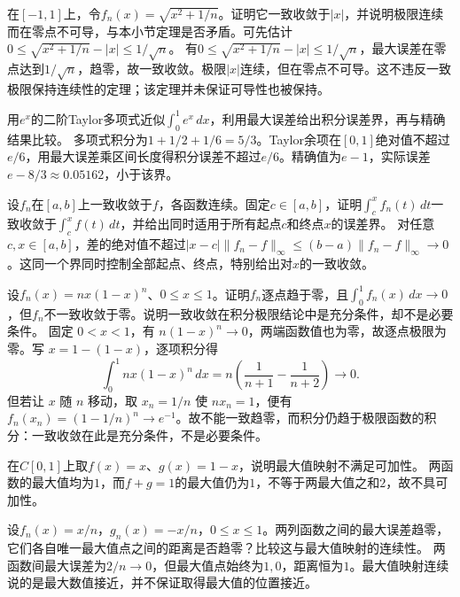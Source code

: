 在\([-1,1]\)上，令\(f_n(x)=\sqrt{x^2+1/n}\)。证明它一致收敛于\(|x|\)，并说明极限连续而在零点不可导，与本小节定理是否矛盾。可先估计\(0\le\sqrt{x^2+1/n}-|x|\le1/\sqrt n\)。
\solutionanswer
有\(0\le\sqrt{x^2+1/n}-|x|\le1/\sqrt n\)，最大误差在零点达到\(1/\sqrt n\)，趋零，故一致收敛。极限\(|x|\)连续，但在零点不可导。这不违反一致极限保持连续性的定理；该定理并未保证可导性也被保持。


用\(e^x\)的二阶Taylor多项式近似\(\int_0^1e^x\,dx\)，利用最大误差给出积分误差界，再与精确结果比较。
\solutionanswer
多项式积分为\(1+1/2+1/6=5/3\)。Taylor余项在\([0,1]\)绝对值不超过\(e/6\)，用最大误差乘区间长度得积分误差不超过\(e/6\)。精确值为\(e-1\)，实际误差\(e-8/3\approx0.05162\)，小于该界。


设\(f_n\)在\([a,b]\)上一致收敛于\(f\)，各函数连续。固定\(c\in[a,b]\)，证明\(\int_c^xf_n(t)\,dt\)一致收敛于\(\int_c^xf(t)\,dt\)，并给出同时适用于所有起点\(c\)和终点\(x\)的误差界。
\solutionanswer
对任意\(c,x\in[a,b]\)，差的绝对值不超过\(|x-c|\|f_n-f\|_\infty\le(b-a)\|f_n-f\|_\infty\to0\)。这同一个界同时控制全部起点、终点，特别给出对\(x\)的一致收敛。


设\(f_n(x)=nx(1-x)^n\)、\(0\le x\le1\)。证明\(f_n\)逐点趋于零，且\(\int_0^1f_n(x)\,dx\to0\)，但\(f_n\)不一致收敛于零。说明一致收敛在积分极限结论中是充分条件，却不是必要条件。
\solutionanswer
固定 \(0<x<1\)，有 \(n(1-x)^n\to0\)，两端函数值也为零，故逐点极限为零。写 \(x=1-(1-x)\)，逐项积分得
\[
 \int_0^1 nx(1-x)^n\,dx
 =n\left(\frac1{n+1}-\frac1{n+2}\right)\longrightarrow0 .
\]
但若让 \(x\) 随 \(n\) 移动，取 \(x_n=1/n\) 使 \(nx_n=1\)，便有 \(f_n(x_n)=(1-1/n)^n\to e^{-1}\)。故不能一致趋零，而积分仍趋于极限函数的积分：一致收敛在此是充分条件，不是必要条件。


在\(C[0,1]\)上取\(f(x)=x\)、\(g(x)=1-x\)，说明最大值映射不满足可加性。
\solutionanswer
两函数的最大值均为\(1\)，而\(f+g=1\)的最大值仍为\(1\)，不等于两最大值之和\(2\)，故不具可加性。


设\(f_n(x)=x/n\)，\(g_n(x)=-x/n\)，\(0\le x\le1\)。两列函数之间的最大误差趋零，它们各自唯一最大值点之间的距离是否趋零？比较这与最大值映射的连续性。
\solutionanswer
两函数间最大误差为\(2/n\to0\)，但最大值点始终为\(1,0\)，距离恒为\(1\)。最大值映射连续说的是最大数值接近，并不保证取得最大值的位置接近。


